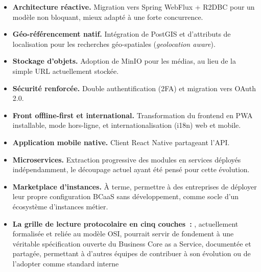 \begin{itemize}
  \item \textbf{Architecture réactive.} Migration vers Spring WebFlux + R2DBC pour un
        modèle non bloquant, mieux adapté à une forte concurrence.
  \item \textbf{Géo-référencement natif.} Intégration de PostGIS et d'attributs de
        localisation pour les recherches géo-spatiales (\emph{geolocation aware}).
  \item \textbf{Stockage d'objets.} Adoption de MinIO pour les médias, au lieu de la simple
        URL actuellement stockée.
  \item \textbf{Sécurité renforcée.} Double authentification (2FA) et migration vers
        OAuth 2.0.
  \item \textbf{Front offline-first et international.} Transformation du frontend en PWA
        installable, mode hors-ligne, et internationalisation (i18n) web et mobile.
  \item \textbf{Application mobile native.} Client React Native partageant l'API.
  \item \textbf{Microservices.} Extraction progressive des modules en services déployés
        indépendamment, le découpage actuel ayant été pensé pour cette évolution.
  \item \textbf{Marketplace d'instances.} À terme, permettre à des entreprises de déployer
        leur propre configuration BCaaS sans développement, comme socle d'un écosystème
        d'instances métier.
  \item \textbf{ La grille de lecture protocolaire en cinq couches : }, actuellement formalisée et reliée au modèle OSI, pourrait servir de fondement à une véritable spécification ouverte du Business Core as a Service, documentée et partagée, permettant à d'autres équipes de contribuer à son évolution ou de l'adopter comme standard interne
\end{itemize}
